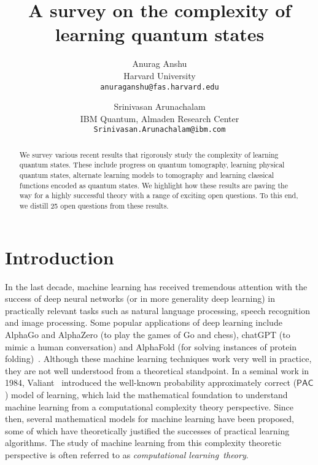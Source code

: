 \documentclass[11pt]{article}
\title{A survey on the complexity of learning quantum states}
\date{}
\author{
    Anurag Anshu\\[2mm]
    Harvard
    University\\
    \small \texttt{anuraganshu@fas.harvard.edu} 
    \and
    Srinivasan Arunachalam\\[2mm]
     IBM Quantum, Almaden Research Center\\
    \small \texttt{Srinivasan.Arunachalam@ibm.com}
    }
\newcommand{\PAC}{\ensuremath{\mathsf{PAC}}}
\begin{document}
\maketitle
\begin{abstract}
 We survey various recent results that rigorously study the complexity of learning quantum states. 
 These include progress on quantum tomography, learning physical quantum states, alternate learning models to tomography and learning classical functions encoded as quantum states.  We highlight how these results are paving the way for a highly successful theory with a range of exciting open questions. To this end, we distill 25 open questions from these results. 
\end{abstract}



\section{Introduction}

   In the last decade, machine learning has received tremendous attention with the success of deep neural networks (or in more generality deep learning)  in practically relevant tasks such as natural language processing, speech recognition and image processing. Some popular applications of deep learning include AlphaGo  and AlphaZero (to play the games of Go and chess), chatGPT (to mimic a human conversation) and AlphaFold (for solving instances of protein folding)~\cite{jumper2021highly,vaswani2017attention,silver2017mastering}.  Although these machine learning techniques work very well in practice, they are not well understood from a theoretical standpoint. In a seminal work in 1984, Valiant~\cite{DBLP:journals/cacm/Valiant84} introduced the well-known probability approximately correct ($\PAC$) model of learning, which laid the mathematical foundation to understand machine learning from a computational complexity theory perspective. Since then, several mathematical models for machine learning have been proposed, some of which have theoretically justified the successes of practical learning algorithms. The study of machine learning from this complexity theoretic perspective is often referred to as \emph{computational learning~theory}. 
   
\end{document}
